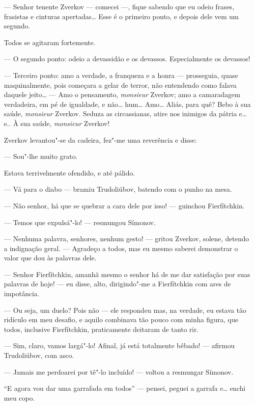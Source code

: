 --- Senhor tenente Zverkov --- comecei ---, fique sabendo que eu odeio
frases, frasistas e cinturas apertadas\ldots{} Esse é o primeiro ponto, e
depois dele vem um segundo.

Todos se agitaram fortemente.

--- O segundo ponto: odeio a devassidão e os devassos. Especialmente os
devassos!

--- Terceiro ponto: amo a verdade, a franqueza e a honra --- prosseguia,
quase maquinalmente, pois começara a gelar de terror, não entendendo
como falava daquele jeito\ldots{} --- Amo o pensamento, \emph{monsieur}
Zverkov; amo a camaradagem verdadeira, em pé de igualdade, e não\ldots{}
hum\ldots{} Amo\ldots{} Aliás, para quê? Bebo à sua saúde, \emph{monsieur}
Zverkov. Seduza as circassianas, atire nos inimigos da pátria e\ldots{} e.. À
sua saúde, \emph{monsieur} Zverkov!

Zverkov levantou"-se da cadeira, fez"-me uma reverência e disse:

--- Sou"-lhe muito grato.

Estava terrivelmente ofendido, e até pálido.

--- Vá para o diabo --- bramiu Trudoliúbov, batendo com o punho na mesa.

--- Não senhor, há que se quebrar a cara dele por isso! --- guinchou
Fierfítchkin.

--- Temos que expulsá"-lo! --- resmungou Símonov.

--- Nenhuma palavra, senhores, nenhum gesto! --- gritou Zverkov, solene,
detendo a indignação geral. --- Agradeço a todos, mas eu mesmo saberei
demonstrar o valor que dou às palavras dele.

--- Senhor Fierfítchkin, amanhã mesmo o senhor há de me dar satisfação por
suas palavras de hoje! --- eu disse, alto, dirigindo"-me a Fierfítchkin com
ares de impotância.

--- Ou seja, um duelo? Pois não --- ele respondeu mas, na verdade, eu
estava tão ridículo em meu desafio, e aquilo combinava tão pouco com
minha figura, que todos, inclusive Fierfítchkin, praticamente deitaram
de tanto rir.

--- Sim, claro, vamos largá"-lo! Afinal, já está totalmente bêbado! ---
afirmou Trudoliúbov, com asco.

--- Jamais me perdoarei por tê"-lo incluído! --- voltou a resmungar Símonov.

``E agora vou dar uma garrafada em todos'' --- pensei, peguei a garrafa
e\ldots{} enchi meu copo.


